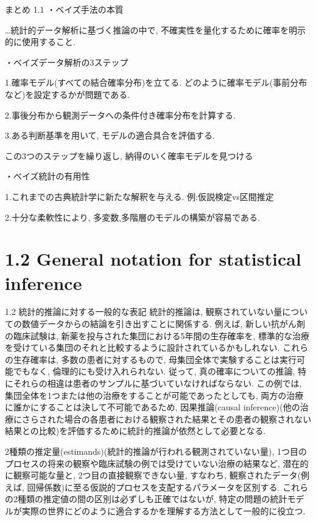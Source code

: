 \documentclass[10pt,dvipdfmx,a4]{beamer}
\begin{document}

\begin{frame}{まとめ 1.1 }
・ベイズ手法の本質

…統計的データ解析に基づく推論の中で, 不確実性を量化するために確率を明示的に使用すること.

・ベイズデータ解析の3ステップ

1.確率モデル(すべての結合確率分布)を立てる.
どのように確率モデル(事前分布など)を設定するかが問題である.

2.事後分布から観測データへの条件付き確率分布を計算する.

3.ある判断基準を用いて, モデルの適合具合を評価する.

この3つのステップを繰り返し, 納得のいく確率モデルを見つける

・ベイズ統計の有用性

1.これまでの古典統計学に新たな解釈を与える. 例:仮説検定vs区間推定

2.十分な柔軟性により, 多変数,多階層のモデルの構築が容易である.
\end{frame}

\section{1.2 General notation for statistical inference}
\begin{frame}{1.2 統計的推論に対する一般的な表記}
統計的推論は, 観察されていない量についての数値データからの結論を引き出すことに関係する.
例えば, 新しい抗がん剤の臨床試験は, 新薬を投与された集団における5年間の生存確率を, 標準的な治療を受けている集団のそれと比較するように設計されているかもしれない.
これらの生存確率は, 多数の患者に対するもので, 母集団全体で実験することは実行可能でもなく, 倫理的にも受け入れられない.
従って, 真の確率についての推論, 特にそれらの相違は患者のサンプルに基づいていなければならない.
この例では, 集団全体を1つまたは他の治療をすることが可能であったとしても, 両方の治療に誰かにすることは決して不可能であるため, 因果推論(causal inference)(他の治療にさらされた場合の各患者における観察された結果とその患者の観察されない結果との比較)を評価するために統計的推論が依然として必要となる.
\end{frame}


\begin{frame}
2種類の推定量(estimands)(統計的推論が行われる観測されていない量), 1つ目のプロセスの将来の観察や臨床試験の例では受けていない治療の結果など, 潜在的に観察可能な量と, 2つ目の直接観察できない量, すなわち, 観察されたデータ(例えば, 回帰係数)に至る仮説的プロセスを支配するパラメータを区別する.
これらの2種類の推定値の間の区別は必ずしも正確ではないが, 特定の問題の統計モデルが実際の世界にどのように適合するかを理解する方法として一般的に役立つ.
\end{frame}
\end{document}
